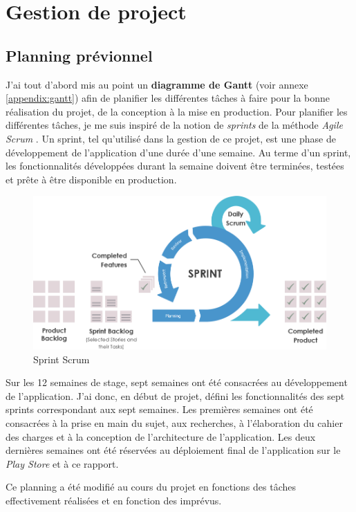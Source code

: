 \section{Gestion de project}

\subsection{Planning prévionnel}

J'ai tout d'abord mis au point un \textbf{diagramme de Gantt} (voir annexe \ref{appendix:gantt}) afin de planifier les différentes tâches à faire pour la bonne réalisation du projet, de la conception à la mise en production. Pour planifier les différentes tâches, je me suis inspiré de la notion de \textit{sprints} de la méthode \textit{Agile Scrum} \cite{scrum}. Un sprint, tel qu'utilisé dans la gestion de ce projet, est une phase de développement de l'application d'une durée d'une semaine. Au terme d'un sprint, les fonctionnalités développées durant la semaine doivent être terminées, testées et prête à être disponible en production.

\begin{figure}[H]
  \includegraphics[width=.7\linewidth]{content/imgs/scrum_sprint.png}
  \caption{Sprint Scrum}
\end{figure}

Sur les 12 semaines de stage, sept semaines ont été consacrées au développement de l'application. J'ai donc, en début de projet, défini les fonctionnalités des sept sprints correspondant aux sept semaines. Les premières semaines ont été consacrées à la prise en main du sujet, aux recherches, à l'élaboration du cahier des charges et à la conception de l'architecture de l'application. Les deux dernières semaines ont été réservées au déploiement final de l'application sur le \textit{Play Store} et à ce rapport.

Ce planning a été modifié au cours du projet en fonctions des tâches effectivement réalisées et en fonction des imprévus.

